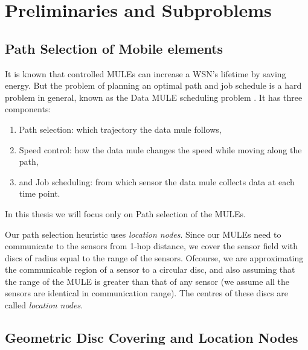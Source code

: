 \chapter{Preliminaries and Subproblems}
\label{chap:location_nodes}

\section{Path Selection of Mobile elements}
It is known that controlled MULEs can increase a WSN's lifetime by saving energy. But the problem of planning an optimal path and job schedule is a hard problem in general, known as the Data MULE scheduling problem \cite{dms}. It has three components:
\begin{enumerate}
\item Path selection: which trajectory the data mule follows,
\item Speed control: how the data mule changes the speed while moving along the path,
\item and Job scheduling: from which sensor the data mule collects data at each time point.
\end{enumerate}
In this thesis we will focus only on Path selection of the MULEs.

Our path selection heuristic uses \emph{location nodes}. Since our MULEs need to communicate to  the sensors from 1-hop distance, we cover the sensor field with discs of radius equal to the range of the sensors. Ofcourse, we are approximating the communicable region of a sensor to a circular disc, and also assuming that the range of the MULE is greater than that of any sensor (we assume all the sensors are identical in communication range). The centres of these discs are called \emph{location nodes}.

\section{Geometric Disc Covering and Location Nodes}

